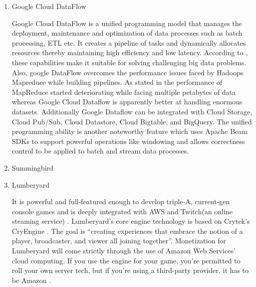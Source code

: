 \begin{enumerate}
\item {} 
Google Cloud DataFlow

Google Cloud DataFlow \label{\detokenize{i524/technologies:id249}}{\hyperref[\detokenize{i524/technologies:www-cloud-google1}]{\sphinxcrossref{{[}209{]}}}} is a unified
programming model that manages the deployment, maintenance and
optimization of data processes such as batch processing, ETL
etc. It creates a pipeline of tasks and dynamically allocates
resources thereby maintaining high efficiency and low
latency. According to \label{\detokenize{i524/technologies:id250}}{\hyperref[\detokenize{i524/technologies:www-cloud-google1}]{\sphinxcrossref{{[}209{]}}}}, these
capabilities make it suitable for solving challenging big data
problems. Also, google DataFlow overcomes the performance issues
faced by Hadoops Mapreduce while building pipelines. As stated in
\label{\detokenize{i524/technologies:id251}}{\hyperref[\detokenize{i524/technologies:www-dataconomy}]{\sphinxcrossref{{[}210{]}}}} the performance of MapReduce started
deteriorating while facing multiple petabytes of data whereas
Google Cloud Dataflow is apparently better at handling enormous
datasets.  \label{\detokenize{i524/technologies:id252}}{\hyperref[\detokenize{i524/technologies:www-cloud-google1}]{\sphinxcrossref{{[}209{]}}}} Additionally Google Dataflow
can be integrated with Cloud Storage, Cloud Pub/Sub, Cloud
Datastore, Cloud Bigtable, and BigQuery. The unified programming
ability is another noteworthy feature which uses Apache Beam SDKs
to support powerful operations like windowing and allows
correctness control to be applied to batch and stream data
processes.

\item {} 
Summingbird

\item {} 
Lumberyard

It is powerful and full-featured enough to develop triple-A,
current-gen console games and is deeply integrated with AWS and
Twitch(an online steaming service)
\label{\detokenize{i524/technologies:id253}}{\hyperref[\detokenize{i524/technologies:gamasutra}]{\sphinxcrossref{{[}211{]}}}}. Lumberyard's core engine technology is based
on Crytek's CryEngine \label{\detokenize{i524/technologies:id254}}{\hyperref[\detokenize{i524/technologies:hands}]{\sphinxcrossref{{[}212{]}}}}. The goal is ``creating
experiences that embrace the notion of a player, broadcaster, and
viewer all joining together''\label{\detokenize{i524/technologies:id255}}{\hyperref[\detokenize{i524/technologies:gamasutra}]{\sphinxcrossref{{[}211{]}}}}. Monetization for
Lumberyard will come strictly through the use of Amazon Web
Services' cloud computing. If you use the engine for your game,
you're permitted to roll your own server tech, but if you're
using a third-party provider, it has to be Amazon \label{\detokenize{i524/technologies:id256}}{\hyperref[\detokenize{i524/technologies:what}]{\sphinxcrossref{{[}213{]}}}}.

\end{enumerate}



